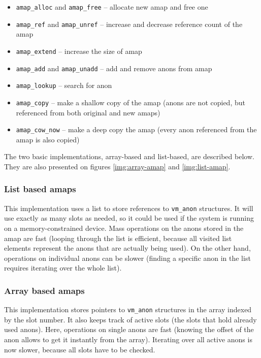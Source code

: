 \begin{itemize}
  \item \texttt{amap_alloc} and \texttt{amap_free} -- allocate new amap and free one
  \item \texttt{amap_ref} and \texttt{amap_unref} -- increase and decrease reference count of the amap
  \item \texttt{amap_extend} -- increase the size of amap
  \item \texttt{amap_add} and \texttt{amap_unadd} -- add and remove anons from amap
  \item \texttt{amap_lookup} -- search for anon
  \item \texttt{amap_copy} -- make a shallow copy of the amap (anons are not copied, but referenced from both original and new amaps)
  \item \texttt{amap_cow_now} -- make a deep copy the amap (every anon referenced from the amap is also copied)
\end{itemize}

The two basic implementations, array-based and list-based, are described below.
They are also presented on figures \ref{img:array-amap} and \ref{img:list-amap}.

\subsubsection{List based amaps}

This implementation uses a list to store references to \texttt{vm_anon} structures.
It will use exactly as many slots as needed, so it could be used if the system is running on a memory-constrained device.
Mass operations on the anons stored in the amap are fast
(looping through the list is efficient, because all visited list elements represent the anons that are actually being used).
On the other hand, operations on individual anons can be slower (finding a specific anon in the list requires iterating over the whole list).

\subsubsection{Array based amaps}

This implementation stores pointers to \texttt{vm_anon} structures in the array indexed by the slot number.
It also keeps track of active slots (the slots that hold already used anons).
Here, operations on single anons are fast (knowing the offset of the anon allows to get it instantly from the array).
Iterating over all active anons is now slower, because all slots have to be checked.

